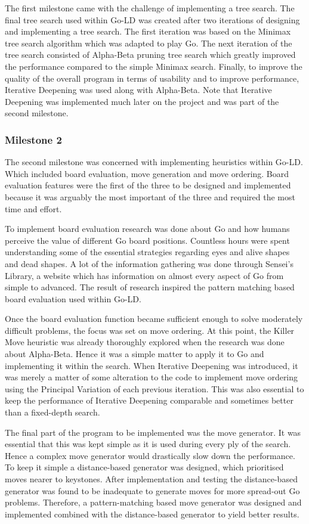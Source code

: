 \documentclass{l4proj}
\begin{document}
The first milestone came with the challenge of implementing a tree search. The final tree search used within Go-LD was created after two iterations of designing and implementing a tree search. The first iteration was based on the Minimax tree search algorithm which was adapted to play Go. The next iteration of the tree search consisted of Alpha-Beta pruning tree search which greatly improved the performance compared to the simple Minimax search. Finally, to improve the quality of the overall program in terms of usability and to improve performance, Iterative Deepening was used along with Alpha-Beta. Note that Iterative Deepening was implemented much later on the project and was part of the second milestone.

\subsubsection{Milestone 2}
The second milestone was concerned with implementing heuristics within Go-LD. Which  included board evaluation, move generation and move ordering. Board evaluation features were the first of the three to be designed and implemented because it was arguably the most important of the three and required the most time and effort.

To implement board evaluation research was done about Go and how humans perceive the value of different Go board positions. Countless hours were spent understanding some of the essential strategies regarding eyes and alive shapes and dead shapes. A lot of the information gathering was done through Sensei’s Library, a website \citep{Senseis} which has information on almost every aspect of Go from simple to advanced. The result of research inspired the pattern matching based board evaluation used within Go-LD.

Once the board evaluation function became sufficient enough to solve moderately difficult problems, the focus was set on move ordering. At this point, the Killer Move heuristic was already thoroughly explored when the research was done about Alpha-Beta. Hence it was a simple matter to apply it to Go and implementing it within the search. When Iterative Deepening was introduced, it was merely a matter of some alteration to the code to implement move ordering using the Principal Variation of each previous iteration. This was also essential to keep the performance of Iterative Deepening comparable and sometimes better than a fixed-depth search.

The final part of the program to be implemented was the move generator. It was essential that this was kept simple as it is used during every ply of the search. Hence a complex move generator would drastically slow down the performance. To keep it simple a distance-based generator was designed, which prioritised moves nearer to keystones. After implementation and testing the distance-based generator was found to be inadequate to generate moves for more spread-out Go problems. Therefore, a pattern-matching based move generator was designed and implemented combined with the distance-based generator to yield better results.
\end{document}
